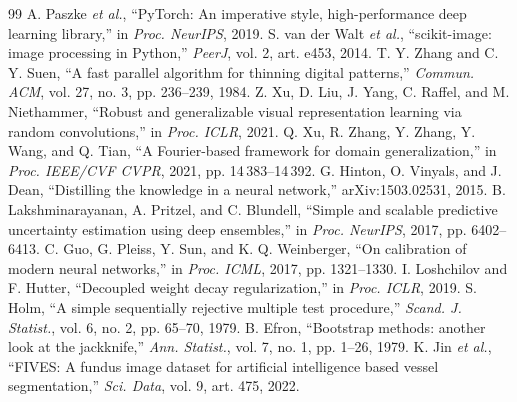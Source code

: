 \documentclass[conference]{IEEEtran}
\begin{document}
\begin{thebibliography}{99}
 A. Paszke \emph{et al.}, ``PyTorch: An imperative style, high-performance deep learning library,'' in \emph{Proc. NeurIPS}, 2019.
 S. van der Walt \emph{et al.}, ``scikit-image: image processing in Python,'' \emph{PeerJ}, vol. 2, art. e453, 2014.
 T. Y. Zhang and C. Y. Suen, ``A fast parallel algorithm for thinning digital patterns,'' \emph{Commun. ACM}, vol. 27, no. 3, pp. 236--239, 1984.
 Z. Xu, D. Liu, J. Yang, C. Raffel, and M. Niethammer, ``Robust and generalizable visual representation learning via random convolutions,'' in \emph{Proc. ICLR}, 2021.
 Q. Xu, R. Zhang, Y. Zhang, Y. Wang, and Q. Tian, ``A Fourier-based framework for domain generalization,'' in \emph{Proc. IEEE/CVF CVPR}, 2021, pp. 14\,383--14\,392.
 G. Hinton, O. Vinyals, and J. Dean, ``Distilling the knowledge in a neural network,'' arXiv:1503.02531, 2015.
 B. Lakshminarayanan, A. Pritzel, and C. Blundell, ``Simple and scalable predictive uncertainty estimation using deep ensembles,'' in \emph{Proc. NeurIPS}, 2017, pp. 6402--6413.
 C. Guo, G. Pleiss, Y. Sun, and K. Q. Weinberger, ``On calibration of modern neural networks,'' in \emph{Proc. ICML}, 2017, pp. 1321--1330.
 I. Loshchilov and F. Hutter, ``Decoupled weight decay regularization,'' in \emph{Proc. ICLR}, 2019.
 S. Holm, ``A simple sequentially rejective multiple test procedure,'' \emph{Scand. J. Statist.}, vol. 6, no. 2, pp. 65--70, 1979.
 B. Efron, ``Bootstrap methods: another look at the jackknife,'' \emph{Ann. Statist.}, vol. 7, no. 1, pp. 1--26, 1979.
 K. Jin \emph{et al.}, ``FIVES: A fundus image dataset for artificial intelligence based vessel segmentation,'' \emph{Sci. Data}, vol. 9, art. 475, 2022.
\end{thebibliography}
\end{document}
